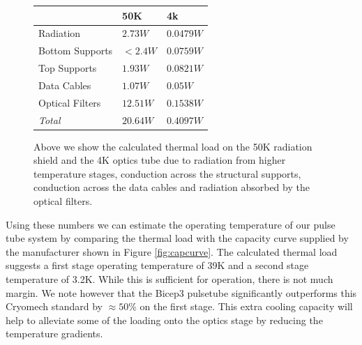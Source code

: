 \documentclass[12pt]{article}
\begin{document}
\begin{figure}
	\center
	\begin{tabular}{|l||l||l|}
		\hline
		& \textbf{50K}  & \textbf{4k}\\
		\hline \hline
		Radiation & $2.73 W$ & $0.0479 W$\\
		Bottom Supports & $<2.4 W$ & $0.0759 W$\\
		Top Supports & $1.93 W$ & $0.0821 W$\\
		Data Cables & $1.07 W$ & $0.05 W$\\
		Optical Filters & $12.51 W$ & $0.1538 W$\\
		\hline
		\textit{Total} & $20.64 W$ & $0.4097 W$\\
		\hline
	\end{tabular}
	\caption{Above we show the calculated thermal load on the 50K radiation
	shield and the 4K optics tube due to radiation from higher temperature
	stages, conduction across the structural supports, conduction across the
	data cables and radiation absorbed by the optical filters.}
	\label{table:heatload}
\end{figure}


Using these numbers we can estimate the operating temperature of our pulse
tube system by comparing the thermal load with the capacity curve supplied by
the manufacturer shown in Figure \ref{fig:capcurve}. The calculated thermal
load suggests a first stage operating temperature of 39K and a second stage
temperature of 3.2K. While this is sufficient for operation, there is not much
margin. We note however that the Bicep3 pulsetube significantly outperforms
this Cryomech standard by $\approx 50\%$ on the first stage. This extra
cooling capacity will help to alleviate some of the loading onto the optics
stage by reducing the temperature gradients.
\end{document}
